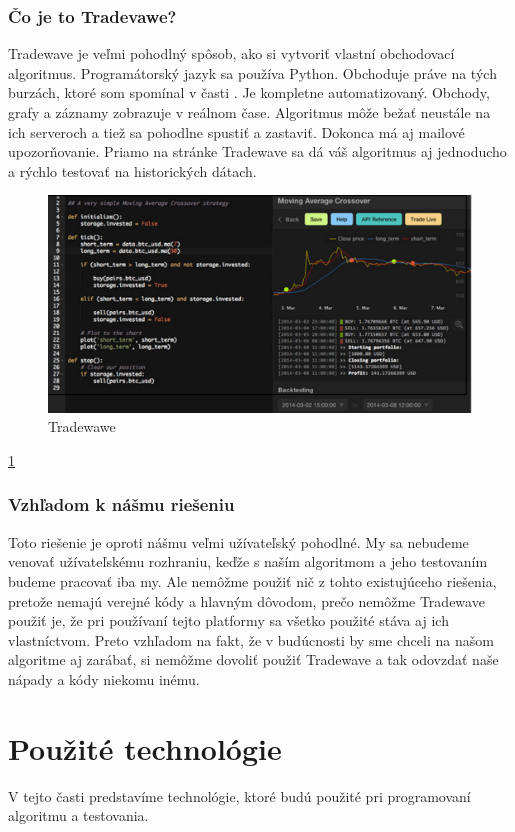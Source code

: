\subsubsection{Čo je to Tradevawe?} 
Tradewave je veľmi pohodlný spôsob, ako si vytvoriť vlastní obchodovací algoritmus. Programátorský jazyk sa používa Python. Obchoduje práve na tých burzách, ktoré som spomínal v časti . Je kompletne automatizovaný. Obchody, grafy a záznamy zobrazuje v reálnom čase. Algoritmus môže bežať neustále na ich serveroch a tiež sa pohodlne spustiť a zastaviť. Dokonca má aj mailové upozorňovanie. Priamo na stránke Tradewave sa dá váš algoritmus aj jednoducho a rýchlo testovať na historických dátach.  \cite{Tw} 
\begin{figure}[!hbt] 
\begin{center} 
\includegraphics[width=1\textwidth]{trade} 
\caption{Tradewawe} 
\label{img:trade} 
\end{center} 
\end{figure} 
\ref{img:trade} 
\subsubsection{Vzhľadom k nášmu riešeniu} 
Toto riešenie je oproti nášmu veľmi užívateľský pohodlné. My sa nebudeme venovať užívateľskému rozhraniu, keďže s naším algoritmom a jeho testovaním budeme pracovať iba my. Ale nemôžme použiť nič z tohto existujúceho riešenia, pretože nemajú verejné kódy a hlavným dôvodom, prečo nemôžme Tradewave použiť je, že pri používaní tejto platformy sa všetko použité stáva aj ich vlastníctvom. Preto vzhľadom na fakt, že v budúcnosti by sme chceli na našom algoritme aj zarábať, si nemôžme dovoliť použiť Tradewave a tak odovzdať naše nápady a kódy niekomu inému. 
\section{Použité technológie} 
V tejto časti predstavíme technológie, ktoré budú použité pri programovaní algoritmu a testovania. 
